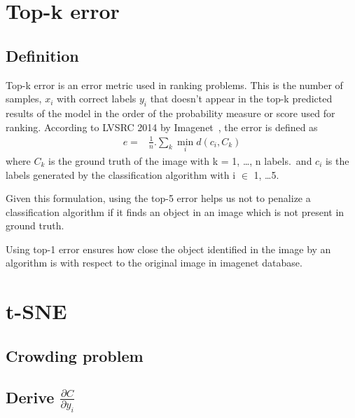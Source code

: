 \documentclass{article}
\begin{document}
\section{Top-k error}
\subsection{Definition}
Top-k error is an error metric used in ranking problems.  
This is the number of samples, $x_{i}$ with correct labels $ y_{i} $ that doesn't appear in the top-k predicted results of the model in the order of the probability measure or score used for ranking.  
According to LVSRC 2014 by Imagenet~\cite{ILSVRC15}, the error is defined as
\begin{align*}
  e =& \frac{1}{n}. \sum_{k} \min_{i} d(c_{i}, C_{k})
\end{align*}
where $C_{k}$ is the ground truth of the image with k = 1, \ldots, n labels.\ 
and $c_{i}$ is the labels generated by the classification algorithm with i $\in$ 1, \ldots 5.

Given this formulation, using the top-5 error helps us not to penalize a classification algorithm if it finds an object in an image which is not present in ground truth.

Using top-1 error ensures how close the object identified in the image by an algorithm is with respect to the original image in imagenet database.

\section{t-SNE}
\subsection{Crowding problem}
\subsection{Derive $\frac{\partial C}{\partial y_{i}}$}



\end{document}
